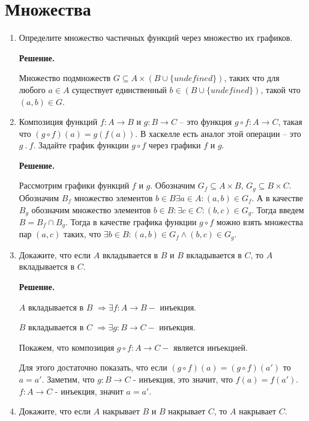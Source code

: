 \section*{Множества}
\begin{enumerate}

\item Определите множество частичных функций через множество их графиков.

\textbf{Решение.} 

Множество подмножеств $G \subseteq A \times (B \cup \{undefined\})$,
таких что для любого $a \in A$ существует единственный
$b \in (B \cup \{undefined\})$, такой что $(a, b) \in G$.

\item Композиция функций $f : A \to B$ и $g : B \to C$ -- это функция $g 
\circ f : A \to C$, 
такая что $(g \circ f)(a) = g(f(a))$.
    В хаскелле есть аналог этой операции -- это $g\ .\ f$.
    Задайте график функции $g \circ f$ через графики $f$ и $g$.

\textbf{Решение.} 

Рассмотрим графики функций $f$ и $g$. Обозначим $G_f \subseteq A \times 
B$, $G_g \subseteq B \times C$. Обозначим $B_f$ множество элементов $b \in 
B \exists a \in A : (a, b) \in G_f$. А в качестве $B_g$ обозначим 
множество элементов $b\in B : \exists c \in C : (b, c) \in G_g$. Тогда введем
$B = B_f \cap B_g$. Тогда в качестве графика функции $g \circ f$ 
можно взять множества пар $(a, c)$ 
таких, что $\exists b \in B : (a, b) \in G_f \land (b, c) \in G_g$.  

\item Докажите, что если $A$ вкладывается в $B$ и $B$ вкладывается в $C$, 
то $A$ вкладывается в $C$.

\textbf{Решение.} 

$A$ вкладывается в $B$ $\Rightarrow \exists f:A\rightarrow B - $ инъекция.

$B$ вкладывается в $C$ $\Rightarrow \exists g:B\rightarrow C - $ инъекция.

Покажем, что композиция $g \circ f : A\rightarrow C - $ является инъекцией.

Для этого достаточно показать, что если $(g \circ f)(a) = (g \circ f)(a')$ 
то $a = a'$. Заметим, что $g:B\rightarrow C$ - инъекция, это значит, что 
$f(a) = f(a')$. $f:A\rightarrow C$ - инъекция, значит $a = a'$.

\item Докажите, что если $A$ накрывает $B$ и $B$ накрывает $C$, то $A$ накрывает $C$.


\end{enumerate}
